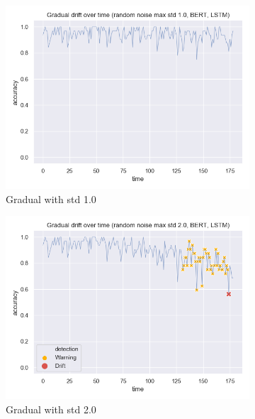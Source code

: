 \documentclass[12pt]{extreport}
\begin{document}
\begin{figure}[H]
\centering
\begin{subfigure}{.5\textwidth}
  \centering
  \includegraphics[width=\linewidth]{assets/detecting-change/gradual_noise_random_std_1_lstm_wos_1_BERT.png}
  \caption{Gradual with std 1.0}
  \label{fig:lstm-gradual-std-1}
\end{subfigure}%
\begin{subfigure}{.5\textwidth}
  \centering
  \includegraphics[width=\linewidth]{assets/detecting-change/gradual_noise_random_std_2_lstm_wos_1_BERT.png}
  \caption{Gradual with std 2.0}
  \label{fig:lstm-gradual-std-2}
\end{subfigure}
\begin{subfigure}{.5\textwidth}

\end{subfigure}
\end{figure}
\end{document}
